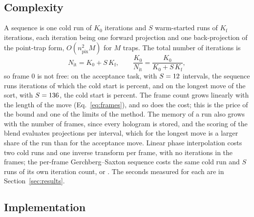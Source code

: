 \subsection{Complexity}

A sequence is one cold run of $K_0$ iterations and $S$ warm-started runs of $K_{\mathrm f}$ iterations, each iteration being one forward projection and one back-projection of the point-trap form, $O(n_{\mathrm{pix}}^2M)$ for $M$ traps. The total number of iterations is
\begin{equation}
N_{\mathrm{it}}=K_0+S\,K_{\mathrm f},\qquad \frac{K_0}{N_{\mathrm{it}}}=\frac{K_0}{K_0+S\,K_{\mathrm f}},\label{eq:cost}
\end{equation}
so frame 0 is not free: on the acceptance task, with $S=\fpeval{\parFrames-1}$ intervals, the sequence runs  iterations of which the cold start is  percent, and on the longest move of the sort, with $S=\fpeval{\cTenFrames-1}$, the cold start is  percent. The frame count grows linearly with the length of the move (Eq.~\ref{eq:frames}), and so does the cost; this is the price of the bound and one of the limits of the method. The memory of a run also grows with the number of frames, since every hologram is stored, and the scoring of the blend evaluates \parSubsteps{} projections per interval, which for the longest move is a larger share of the run than for the acceptance move. Linear phase interpolation costs two cold runs and one inverse transform per frame, with no iterations in the frames; the per-frame Gerchberg--Saxton sequence costs the same cold run and $S$ runs of its own iteration count, \parKimIters{} or \parFrameIters{}. The seconds measured for each are in Section~\ref{sec:results}.

\subsection{Implementation}

